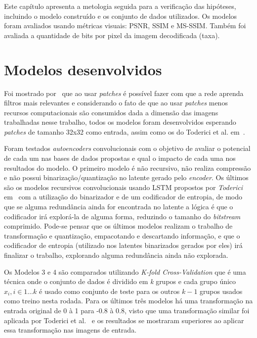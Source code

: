 Este capítulo apresenta a metologia seguida para a verificação das hipóteses, incluindo o modelo construído e os conjunto de dados utilizados. Os modelos foram avaliados usando métricas visuais: \acrshort{PSNR}, \acrshort{SSIM} e \acrshort{MS-SSIM}. Também foi avaliada a quantidade de bits por pixel da imagem decodificada (taxa). 

\section{Modelos desenvolvidos}
Foi mostrado por~\cite{krizhevsky2009, hou2016patch} que ao usar \textit{patches} é possível fazer com que a rede aprenda filtros mais relevantes e considerando o fato de que ao usar \textit{patches} menos recursos computacionais são consumidos dada a dimensão das imagens trabalhadas nesse trabalho, todos os modelos foram desenvolvidos esperando \textit{patches} de tamanho 32x32 como entrada, assim como os do Toderici et al. em~\cite{toderici2016}.

Foram testados \textit{autoencoders} convolucionais com o objetivo de avaliar o potencial de cada um nas bases de dados propostas e qual o impacto de cada uma nos resultados do modelo. O primeiro modelo é não recursivo, não realiza compressão e não possui binarização/quantização no latente gerado pelo \textit{encoder}. Os últimos são os modelos recursivos convolucionais usando \acrshort{LSTM} propostos por \textit{Toderici} em~\cite{toderici2017} com a utilização do binarizador e de um codificador de entropia, de modo que se alguma redundância ainda for encontrada no latente a lógica é que o codificador irá explorá-la de alguma forma, reduzindo o tamanho do \textit{bitstream} comprimido. Pode-se pensar que os últimos modelos realizam o trabalho de transformação e quantização, empacotando e descartando informação, e que o codificador de entropia (utilizado nos latentes binarizados gerados por eles) irá finalizar o trabalho, explorando alguma redundância ainda não explorada.

Os Modelos 3 e 4 são comparados utilizando \textit{K-fold Cross-Validation} que é uma técnica onde o conjunto de dados é dividido em \textit{k} grupos e cada grupo único $x_i, i \in {1 \dots k}$ é usado como conjunto de teste para os outros $k-1$ grupos usados como treino nesta rodada. Para os últimos três modelos há uma transformação na entrada original de 0 à 1 para -0.8 à 0.8, visto que uma transformação similar foi aplicada por Toderici et al.~\cite{toderici2016} e os resultados se mostraram superiores ao aplicar essa transformação nas imagens de entrada.


